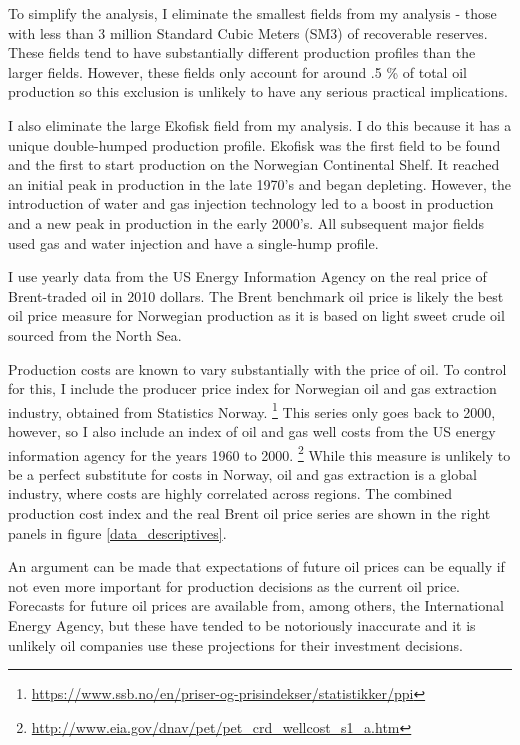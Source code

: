 \documentclass[11pt]{article}
\begin{document}
To simplify the analysis, I eliminate the smallest fields from my analysis - those with less than 3 million Standard Cubic Meters (SM3) of recoverable reserves.  These fields tend to have substantially different production profiles than the larger fields. However, these fields only account for around .5 \% of total oil production so this exclusion is unlikely to have any serious practical implications. 

I also eliminate the large Ekofisk field from my analysis.  I do this because it has a unique double-humped production profile. Ekofisk was the first field to be found and the first to start production on the Norwegian Continental Shelf.  It reached an initial peak in production in the late 1970's and began depleting. However, the introduction of water and gas injection technology led to a boost in production and a new peak in production in the early 2000's. All subsequent major fields used gas and water injection and have a single-hump profile.  

I use yearly data from the US Energy Information Agency on the real price of Brent-traded oil in 2010 dollars. The Brent benchmark oil price is likely the best oil price measure for Norwegian production as it is based on light sweet crude oil sourced from the North Sea.  

Production costs are known to vary substantially with the price of oil.  To control for this, I include the producer price index for Norwegian oil and gas extraction industry, obtained from Statistics Norway. \footnote{\url{https://www.ssb.no/en/priser-og-prisindekser/statistikker/ppi}} This series only goes back to 2000, however, so I also include an index of oil and gas well costs from the US energy information agency for the years 1960 to 2000.  \footnote{\url{http://www.eia.gov/dnav/pet/pet_crd_wellcost_s1_a.htm}} While this measure is unlikely to be a perfect substitute for costs in Norway, oil and gas extraction is a global industry, where costs are highly correlated across regions. The combined production cost index and the real Brent oil price series are shown in the right panels in figure \ref{data_descriptives}.

An argument can be made that expectations of future oil prices can be equally if not even more important for production decisions as the current oil price.  Forecasts for future oil prices are available from, among others, the International Energy Agency, but these have tended to be notoriously inaccurate and it is unlikely oil companies use these projections for their investment decisions.
\end{document}
